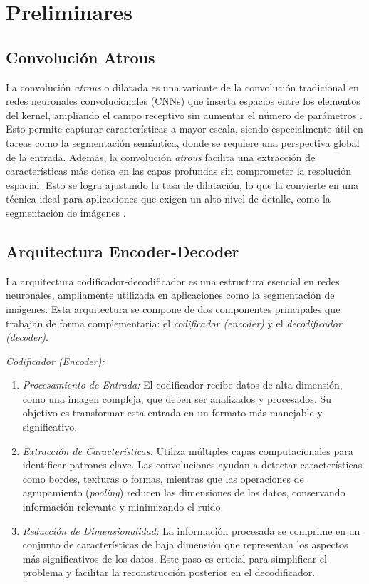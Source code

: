 \section{Preliminares}

\subsection{Convolución Atrous}

La convolución \textit{atrous} o dilatada es una variante de la convolución tradicional en redes neuronales convolucionales (CNNs) que inserta espacios entre los elementos del kernel, ampliando el campo receptivo sin aumentar el número de parámetros \cite{chen2017}. Esto permite capturar características a mayor escala, siendo especialmente útil en tareas como la segmentación semántica, donde se requiere una perspectiva global de la entrada. Además, la convolución \textit{atrous} facilita una extracción de características más densa en las capas profundas sin comprometer la resolución espacial. Esto se logra ajustando la tasa de dilatación, lo que la convierte en una técnica ideal para aplicaciones que exigen un alto nivel de detalle, como la segmentación de imágenes \cite{chollet2016}.

\subsection{Arquitectura Encoder-Decoder}

La arquitectura codificador-decodificador es una estructura esencial en redes neuronales, ampliamente utilizada en aplicaciones como la segmentación de imágenes. Esta arquitectura se compone de dos componentes principales que trabajan de forma complementaria: el \textit{codificador (encoder)} y el \textit{decodificador (decoder)}.

\textit{Codificador (Encoder):}

\begin{enumerate}

    \item \emph{Procesamiento de Entrada:} El codificador recibe datos de alta dimensión, como una imagen compleja, que deben ser analizados y procesados. Su objetivo es transformar esta entrada en un formato más manejable y significativo.

    \item \emph{Extracción de Características:} Utiliza múltiples capas computacionales para identificar patrones clave. Las convoluciones ayudan a detectar características como bordes, texturas o formas, mientras que las operaciones de agrupamiento (\textit{pooling}) reducen las dimensiones de los datos, conservando información relevante y minimizando el ruido.

    \item \emph{Reducción de Dimensionalidad:} La información procesada se comprime en un conjunto de características de baja dimensión que representan los aspectos más significativos de los datos. Este paso es crucial para simplificar el problema y facilitar la reconstrucción posterior en el decodificador.

\end{enumerate}

